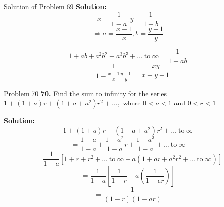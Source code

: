 \documentclass[aspectratio=1610,8pt]{beamer}
\begin{document}
\begin{frame}{Solution of Problem 69}
  \textbf{Solution:} $$x = \frac{1}{1 - a}, y = \frac{1}{1 - b}$$
  $$\Rightarrow a = \frac{x - 1}{x}, b = \frac{y - 1}{y}$$

  $$1 + ab + a^2b^2+ a^3b^3 + \ldots~\text{to}~\infty = \frac{1}{1 - ab}$$
  $$= \frac{1}{1 - \frac{x - 1}{x}\frac{y - 1}{y}} = \frac{xy}{x + y - 1}$$
\end{frame}
\begin{frame}{Problem 70}
  \textbf{70.} Find the sum to infinity for the series $1 + (1 + a)r + (1 + a + a^2)r^2 + \ldots,$ where $0<a<1$ and $0<r<1$
\end{frame}
\begin{frame}
  \textbf{Solution:} $$1 + (1 + a)r + (1 + a + a^2)r^2 + \ldots~\text{to}~\infty$$
  $$= \frac{1- a}{1 - a} + \frac{1 - a^2}{1 - a}r + \frac{1 - a^3}{1 - a} + \ldots~\text{to}~\infty$$
  $$= \frac{1}{1 - a}[1 + r + r^2 + \ldots~\text{to}~\infty - a(1 + ar + a^2r^2 + \ldots~\text{to}~\infty)]$$
  $$= \frac{1}{1 - a}\left[\frac{1}{1 - r} - a\left(\frac{1}{1 - ar}\right)\right]$$
  $$= \frac{1}{(1 - r)(1 - ar)}$$
\end{frame}
\end{document}
